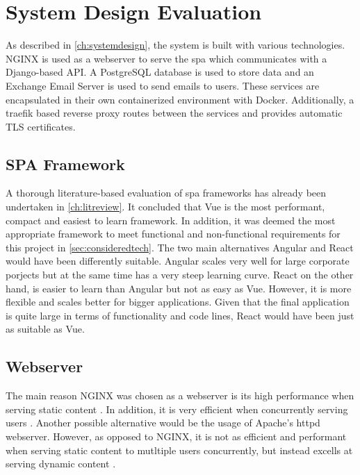 \section{System Design Evaluation}
As described in \autoref{ch:systemdesign}, the system is built with various technologies. NGINX is used as a webserver to serve the \acrshort{spa} which communicates with a Django-based API. A PostgreSQL database is used to store data and an Exchange Email Server is used to send emails to users. These services are encapsulated in their own containerized environment with Docker. Additionally, a traefik based reverse proxy routes between the services and provides automatic TLS certificates.

\subsection{SPA Framework}
A thorough literature-based evaluation of \acrshort{spa} frameworks has already been undertaken in \autoref{ch:litreview}. It concluded that Vue is the most performant, compact and easiest to learn framework. In addition, it was deemed the most appropriate framework to meet functional and non-functional requirements for this project in \autoref{sec:consideredtech}. The two main alternatives Angular and React would have been differently suitable. Angular scales very well for large corporate porjects but at the same time has a very steep learning curve. React on the other hand, is easier to learn than Angular but not as easy as Vue. However, it is more flexible and scales better for bigger applications. Given that the final application is quite large in terms of functionality and code lines, React would have been just as suitable as Vue.

\subsection{Webserver}
The main reason NGINX was chosen as a webserver is its high performance when serving static content \cite{NGINXvsApache:online}. In addition, it is very efficient when concurrently serving users \cite{NGINXvsApache:online}. Another possible alternative would be the usage of Apache's httpd webserver. However, as opposed to NGINX, it is not as efficient and performant when serving static content to mutltiple users concurrently, but instead excells at serving dynamic content \cite{NGINXvsApache:online}.

